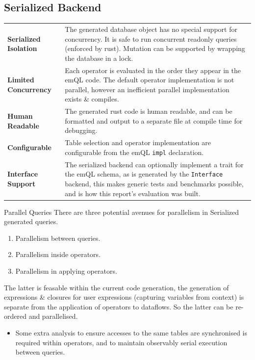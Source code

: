 \subsection{Serialized Backend}
\begin{center}
    \begin{tabular}{l p{}}
        \textbf{Serialized Isolation} & The generated database object has no special support for concurrency. It is safe to run concurrent readonly queries (enforced by rust). Mutation can be supported by wrapping the database in a lock.                                      \\
        \textbf{Limited Concurrency}  & Each operator is evaluated in the order they appear in the emQL code. The default operator implementation is not parallel, however an inefficient parallel implementation exists \& compiles.                                              \\
        \textbf{Human Readable}       & The generated rust code is human readable, and can be formatted and output to a separate file at compile time for debugging.                                                                                                               \\
        \textbf{Configurable}         & Table selection and operator implementation are configurable from the emQL \texttt{impl} declaration.                                                                                                                            \\
        \textbf{Interface Support}    & The serialized backend can optionally implement a trait for the emQL schema, as is generated by the \texttt{Interface} backend, this makes generic tests and benchmarks possible, and is how this report's evaluation was built. \\
    \end{tabular}
\end{center}
\begin{futurebox}{Parallel Queries}
    There are three potential avenues for parallelism in Serialized generated queries.
    \begin{enumerate}
        \setlength\itemsep{0em}
        \item Parallelism between queries.
        \item Parallelism inside operators.
        \item Parallelism in applying operators.
    \end{enumerate}
    The latter is feasable within the current code generation, the generation of expressions \& closures for user expressions (capturing variables from context) is separate from the application of operators to dataflows. So the latter can be re-ordered and parallelised.
    \begin{itemize}
        \setlength\itemsep{0em}
        \item Some extra analysis to ensure accesses to the same tables are synchronised is required within operators, and to maintain observably serial execution between queries.
    \end{itemize}
\end{futurebox}

